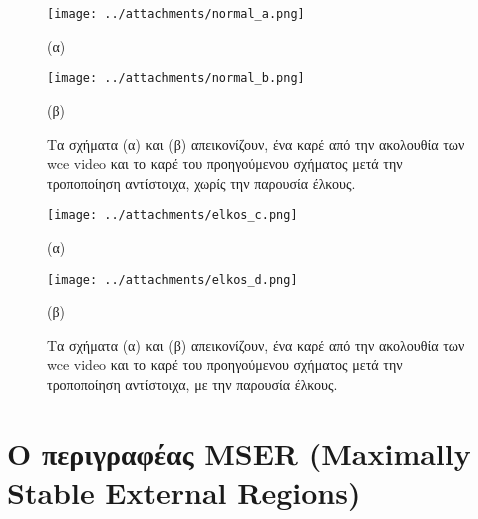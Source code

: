  
\begin{figure}[!ht]
\begin{minipage}[b]{0.5\linewidth}
\centering
\texttt{[image: ../attachments/normal\_a.png]}
\caption*{(α)}
\label{fig:normal_1}
\end{minipage}
\hspace{0.9cm}
\begin{minipage}[b]{0.5\linewidth}
\centering
\texttt{[image: ../attachments/normal\_b.png]}
\caption*{(β)}
\label{fig:normal_2}
\end{minipage}
\caption{Τα σχήματα (α) και (β) απεικονίζουν, ένα καρέ από την ακολουθία των wce video και το καρέ του προηγούμενου σχήματος μετά την τροποποίηση αντίστοιχα, χωρίς την παρουσία έλκους.}
\label{fig:figs_healthy}
\end{figure} 



\begin{figure}[!ht]
\begin{minipage}[b]{0.5\linewidth}
\centering
\texttt{[image: ../attachments/elkos\_c.png]}
\caption*{(α)}
\label{fig:elkos_1}
\end{minipage}
\hspace{0.9cm}
\begin{minipage}[b]{0.5\linewidth}
\centering
\texttt{[image: ../attachments/elkos\_d.png]}
\caption*{(β)}
\label{fig:elkos_2}
\end{minipage}
\caption{Τα σχήματα (α) και (β) απεικονίζουν, ένα καρέ από την ακολουθία των wce video και το καρέ του προηγούμενου σχήματος μετά την τροποποίηση αντίστοιχα, με την παρουσία έλκους.}
\label{fig:figs_dis}
\end{figure} 

\newpage
 
 \section{Ο περιγραφέας MSER (Maximally Stable External Regions) } 
 
